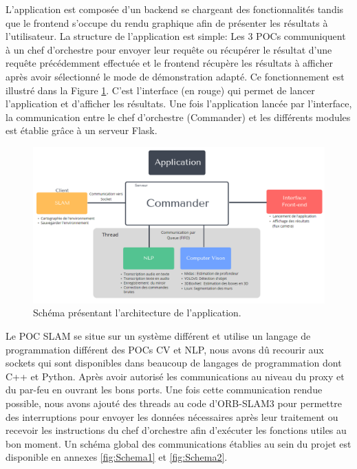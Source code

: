 \documentclass[11pt]{article}
\begin{document}
        \pagebreak

        L'application est composée d'un backend se chargeant des fonctionnalités tandis que le frontend s'occupe du rendu
        graphique afin de présenter les résultats à l'utilisateur. La structure de l'application est simple: Les 3 POCs communiquent à un 
        chef d'orchestre pour envoyer leur requête ou récupérer le résultat d'une requête précédemment effectuée et le frontend récupère
        les résultats à afficher après avoir sélectionné le mode de démonstration adapté. Ce fonctionnement est illustré dans la 
        Figure \ref{fig:Structure}. C'est l'interface (en rouge) qui permet de lancer l'application et d'afficher les résultats.
        Une fois l'application lancée par l'interface, la communication entre le chef d'orchestre (Commander) et les différents modules est 
        établie grâce à un serveur Flask.      

        \begin{figure}[hbt]  
          \includegraphics[width=\textwidth]{StructureApp.png}    
          \caption{Schéma présentant l'architecture de l'application.}
          \label{fig:Structure}
        \end{figure} 
        
        Le POC SLAM se situe sur un système différent et utilise un langage de programmation différent des POCs CV et NLP, nous avons dû
        recourir aux sockets qui sont disponibles dans beaucoup de langages de programmation dont C++ et Python. Après avoir autorisé les 
        communications au niveau du proxy et du par-feu en ouvrant les bons ports.
        Une fois cette communication rendue possible, nous avons ajouté des threads au code d'ORB-SLAM3 pour permettre des interruptions
        pour envoyer les données nécessaires après leur traitement ou recevoir les instructions du chef d'orchestre
        afin d'exécuter les fonctions utiles au bon moment. Un schéma global des communications établies au sein du projet est disponible en 
        annexes \ref{fig:Schema1} et \ref{fig:Schema2}.   
\end{document}
